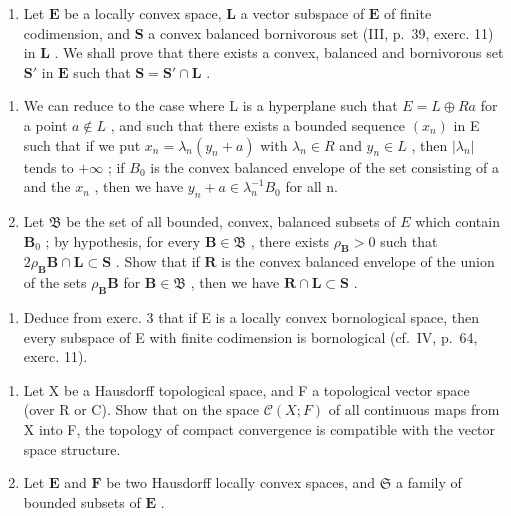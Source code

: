 \begin{enumerate}
\def\labelenumi{\arabic{enumi})}
\setcounter{enumi}{2}
\tightlist
\item
  Let \(\mathbf{E}\) be a locally convex space, \(\mathbf{L}\) a vector subspace of \(\mathbf{E}\) of finite codimension, and \(\mathbf{S}\) a convex balanced bornivorous set (III, p.~39, exerc. 11) in \(\mathbf{L}\) . We shall prove that there exists a convex, balanced and bornivorous set \(\mathbf{S}'\) in \(\mathbf{E}\) such that \(\mathbf{S} = \mathbf{S}' \cap \mathbf{L}\) .
\end{enumerate}

\begin{enumerate}
\def\labelenumi{\alph{enumi})}
\item
  We can reduce to the case where L is a hyperplane such that \(E = L \oplus Ra\) for a point \(a \notin L\) , and such that there exists a bounded sequence \((x_{n})\) in E such that if we put \(x_{n} = \lambda_{n}(y_{n} + a)\) with \(\lambda_{n} \in R\) and \(y_{n} \in L\) , then \(|\lambda_{n}|\) tends to \(+\infty\) ; if \(B_{0}\) is the convex balanced envelope of the set consisting of a and the \(x_{n}\) , then we have \(y_{n} + a \in \lambda_{n}^{-1}B_{0}\) for all n.
\item
  Let \(\mathfrak{B}\) be the set of all bounded, convex, balanced subsets of \(E\) which contain \(\mathbf{B}_0\) ; by hypothesis, for every \(\mathbf{B} \in \mathfrak{B}\) , there exists \(\rho_{\mathbf{B}} > 0\) such that \(2\rho_{\mathbf{B}}\mathbf{B} \cap \mathbf{L} \subset \mathbf{S}\) . Show that if \(\mathbf{R}\) is the convex balanced envelope of the union of the sets \(\rho_{\mathbf{B}}\mathbf{B}\) for \(\mathbf{B} \in \mathfrak{B}\) , then we have \(\mathbf{R} \cap \mathbf{L} \subset \mathbf{S}\) .
\end{enumerate}

\begin{enumerate}
\def\labelenumi{\arabic{enumi})}
\setcounter{enumi}{3}
\tightlist
\item
  Deduce from exerc. 3 that if E is a locally convex bornological space, then every subspace of E with finite codimension is bornological (cf.~IV, p.~64, exerc. 11).
\end{enumerate}

\exercisegroup

\begin{enumerate}
\def\labelenumi{\arabic{enumi})}
\item
  Let X be a Hausdorff topological space, and F a topological vector space (over R or C). Show that on the space \(\mathcal{C}(X; F)\) of all continuous maps from X into F, the topology of compact convergence is compatible with the vector space structure.
\item
  Let \(\mathbf{E}\) and \(\mathbf{F}\) be two Hausdorff locally convex spaces, and \(\mathfrak{S}\) a family of bounded subsets of \(\mathbf{E}\) .
\end{enumerate}

